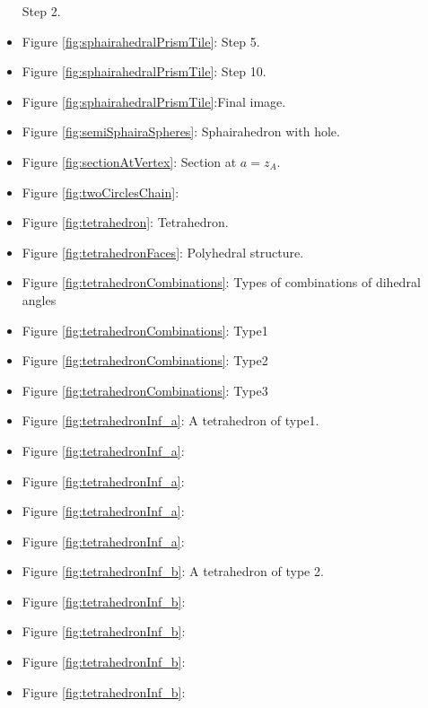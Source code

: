 \documentclass[suppldata, dvipdfmx]{interact}
\theoremstyle{plain}%
\theoremstyle{definition}
\theoremstyle{remark}
\theoremstyle{problemstyle}
\begin{document}
\begin{itemize}
       Step 2.
 \item Figure \ref{fig:sphairahedralPrismTile}:
       Step 5.
 \item Figure \ref{fig:sphairahedralPrismTile}:
       Step 10.
 \item Figure
       \ref{fig:sphairahedralPrismTile}:Final
       image.
\item Figure \ref{fig:semiSphairaSpheres}: Sphairahedron with hole.
\item Figure \ref{fig:sectionAtVertex}: Section at $a=z_A$.
\item Figure \ref{fig:twoCirclesChain}:
\item Figure \ref{fig:tetrahedron}: Tetrahedron.
\item Figure \ref{fig:tetrahedronFaces}: Polyhedral structure.

\item Figure \ref{fig:tetrahedronCombinations}: Types of combinations
      of dihedral angles
\item Figure \ref{fig:tetrahedronCombinations}:
      Type1
\item Figure \ref{fig:tetrahedronCombinations}:
      Type2
\item Figure \ref{fig:tetrahedronCombinations}:
      Type3

\item Figure \ref{fig:tetrahedronInf_a}: A tetrahedron of type1.
\item Figure \ref{fig:tetrahedronInf_a}:
\item Figure \ref{fig:tetrahedronInf_a}:
\item Figure \ref{fig:tetrahedronInf_a}:
\item Figure
      \ref{fig:tetrahedronInf_a}:

\item Figure \ref{fig:tetrahedronInf_b}: A tetrahedron of type 2.
\item Figure
      \ref{fig:tetrahedronInf_b}:
\item Figure
      \ref{fig:tetrahedronInf_b}:
\item Figure \ref{fig:tetrahedronInf_b}:
\item Figure \ref{fig:tetrahedronInf_b}:


\end{itemize}
\end{document}
